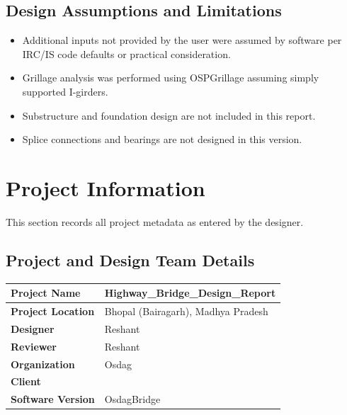 \documentclass[12pt,a4paper]{report}
\numberwithin{table}{chapter}
\numberwithin{figure}{chapter}
\begin{document}
\section*{Design Assumptions and Limitations}
\label{sec:assumptions}

\begin{itemize}
\item Additional inputs not provided by the user were assumed by software per IRC/IS code defaults or practical consideration.
\item Grillage analysis was performed using OSPGrillage assuming simply supported I-girders.
\item Substructure and foundation design are not included in this report.
\item Splice connections and bearings are not designed in this version.
\end{itemize}

\titleformat{\chapter}[block]{\normalfont\Large\bfseries\centering}{\thechapter}{1em}{}
\titlespacing*{\chapter}{0pt}{-30pt}{10pt}


\chapter{Project Information}

This section records all project metadata as entered by the designer.

\section{Project and Design Team Details}
\label{sec:project-details}

\begin{tabular}{|L{5.5cm}|L{8.5cm}|}
\hline
\textbf{Project Name} & Highway\_\allowbreak{}Bridge\_\allowbreak{}Design\_\allowbreak{}Report \\
\hline
\textbf{Project Location} & Bhopal (Bairagarh), Madhya Pradesh \\
\hline
\textbf{Designer} & Reshant \\
\hline
\textbf{Reviewer} & Reshant \\
\hline
\textbf{Organization} & Osdag \\
\hline
\textbf{Client} &  \\
\hline
\textbf{Software Version} & OsdagBridge \\
\hline
\end{tabular}
\end{document}

